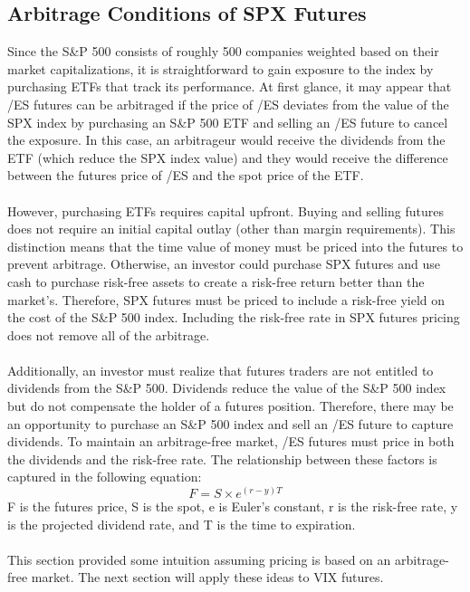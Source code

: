 \documentclass[11pt, oneside]{book}
\begin{document}
\subsection{Arbitrage Conditions of SPX Futures} \label{Futures-Applications-Arb}
Since the S\&P 500 consists of roughly 500 companies weighted based on their market capitalizations, it is straightforward to gain exposure to the index by purchasing ETFs that track its performance. At first glance, it may appear that /ES futures can be arbitraged if the price of /ES deviates from the value of the SPX index by purchasing an S\&P 500 ETF and selling an /ES future to cancel the exposure. In this case, an arbitrageur would receive the dividends from the ETF (which reduce the SPX index value) and they would receive the difference between the futures price of /ES and the spot price of the ETF. \\
\\
However, purchasing ETFs requires capital upfront. Buying and selling futures does not require an initial capital outlay (other than margin requirements). This distinction means that the time value of money must be priced into the futures to prevent arbitrage. Otherwise, an investor could purchase SPX futures and use cash to purchase risk-free assets to create a risk-free return better than the market's. Therefore, SPX futures must be priced to include a risk-free yield on the cost of the S\&P 500 index. Including the risk-free rate in SPX futures pricing does not remove all of the arbitrage. \\
\\
Additionally, an investor must realize that futures traders are not entitled to dividends from the S\&P 500. Dividends reduce the value of the S\&P 500 index but do not compensate the holder of a futures position. Therefore, there may be an opportunity to purchase an S\&P 500 index and sell an /ES future to capture dividends. To maintain an arbitrage-free market, /ES futures must price in both the dividends and the risk-free rate. The relationship between these factors is captured in the following equation:
\begin{equation}
F = S \times e^{(r-y)T}
\end{equation} \label{Eq-CostOfCarry}
F is the futures price, S is the spot, e is Euler's constant, r is the risk-free rate, y is the projected dividend rate, and T is the time to expiration.\\
\\
This section provided some intuition assuming pricing is based on an arbitrage-free market. The next section will apply these ideas to VIX futures.
\end{document}
